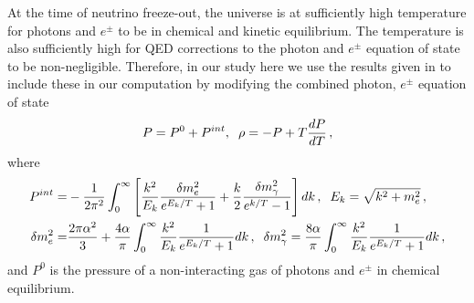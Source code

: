 At the time of neutrino freeze-out, the universe is at sufficiently high temperature for photons and $e^\pm$ to be in chemical and kinetic equilibrium. The temperature is also sufficiently high for QED corrections to the photon and $e^\pm$ equation of state to be non-negligible. Therefore, in our study here we use the results given in \cite{Heckler:1994tv,Mangano:2001iu} to include these in our computation by modifying the combined photon, $e^\pm$ equation of state
\begin{align}
P=P^0+P^{int},\hspace{2mm} \rho=-P+T\frac{dP}{dT}\,,
\end{align}
where
\begin{align}
P^{int}=&-\frac{1}{2\pi^2}\int_0^\infty\left[\frac{k^2}{E_k}\frac{\delta m_e^2}{e^{E_k/T}+1}+\frac{k}{2}\frac{\delta m_\gamma^2}{e^{k/T}-1}\right]dk\,,\hspace{2mm} E_k=\sqrt{k^2+m_e^2}\,,\\
\delta m_e^2=&\frac{2\pi\alpha^2}{3}+\frac{4\alpha}{\pi}\int_0^\infty \frac{k^2}{E_k}\frac{1}{e^{E_k/T}+1}dk\,,\hspace{2mm} \delta m_\gamma^2=\frac{8\alpha}{\pi}\int_0^\infty \frac{k^2}{E_k}\frac{1}{e^{E_k/T}+1}dk\,,
\end{align}
and $P^0$ is the pressure of a non-interacting gas of photons and $e^\pm$ in chemical equilibrium.

